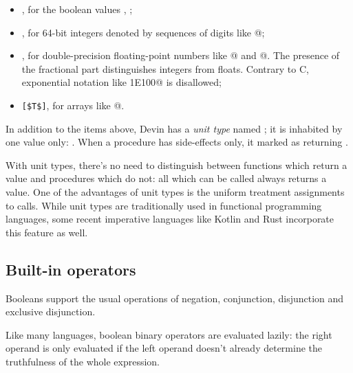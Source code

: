 \documentclass[UdineBachThesis,american,11pt,draft]{PhdThesis}
\begin{document}
  \begin{itemize}
    \item \lstinline@Bool@, for the boolean values \lstinline@true@,
    \lstinline@false@;

    \item \lstinline@Int@, for 64-bit integers denoted by sequences of digits
    like @;

    \item \lstinline@Float@, for double-precision floating-point numbers like
    @ and @. The presence of the fractional part
    distinguishes integers from floats. Contrary to C, exponential notation like
    \lstinline@1E100@ is disallowed;

    \item \lstinline[mathescape]@[$T$]@, for arrays like
    \lstinline@[1, 1, 2, 3, 5, 8, 13, 21, 34, 55]@.
  \end{itemize}

  In addition to the items above, Devin has a \emph{unit type} named
  \lstinline@Unit@; it is inhabited by one value only: \lstinline@unit@. When a
  procedure has side-effects only, it marked as returning \lstinline@Unit@.

  With unit types, there's no need to distinguish between functions which return
  a value and procedures which do not: all which can be called always returns a
  value. One of the advantages of unit types is the uniform treatment
  assignments to calls. While unit types are traditionally used in functional
  programming languages, some recent imperative languages like Kotlin and Rust
  incorporate this feature as well.

  \subsection{Built-in operators}

  Booleans support the usual operations of negation, conjunction, disjunction
  and exclusive disjunction.

  Like many languages, boolean binary operators are evaluated lazily: the right
  operand is only evaluated if the left operand doesn't already determine the
  truthfulness of the whole expression.
\end{document}
